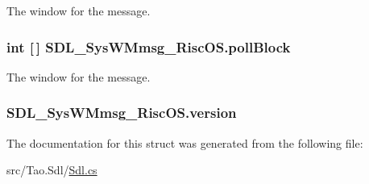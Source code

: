 The window for the message. 

\hypertarget{struct_s_d_l___sys_w_mmsg___risc_o_s_a25f68ce4afc24def27a7b228f80565c0}{
\subsubsection[{pollBlock}]{\setlength{\rightskip}{0pt plus 5cm}int \mbox{[}$\,$\mbox{]} {\bf SDL\_\-SysWMmsg\_\-RiscOS.pollBlock}}}
\label{struct_s_d_l___sys_w_mmsg___risc_o_s_a25f68ce4afc24def27a7b228f80565c0}


The window for the message. 

\hypertarget{struct_s_d_l___sys_w_mmsg___risc_o_s_a94d601d905191552ef3635e28e266857}{
\subsubsection[{version}]{ {\bf SDL\_\-SysWMmsg\_\-RiscOS.version}}}
\label{struct_s_d_l___sys_w_mmsg___risc_o_s_a94d601d905191552ef3635e28e266857}


The documentation for this struct was generated from the following file:\begin{DoxyCompactItemize}
\item 
src/Tao.Sdl/\hyperlink{_sdl_8cs}{Sdl.cs}\end{DoxyCompactItemize}
